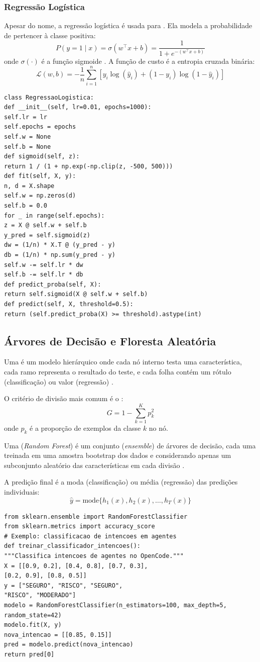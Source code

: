\subsubsection{Regressão Logística}
Apesar do nome, a regressão logística é usada para . Ela modela a probabilidade de pertencer à classe positiva:
\[P(y = 1 \mid x) = \sigma(w^\top x + b) = \frac{1}{1 + e^{-(w^\top x + b)}}
\]
onde $\sigma(\cdot)$ é a função sigmoide \cite{bishop2006pattern}.
A função de custo é a entropia cruzada binária:
\[\mathcal{L}(w, b) = -\frac{1}{n} \sum_{i=1}^n [y_i \log(\hat{y}_i) + (1 - y_i) \log(1 - \hat{y}_i)]
\]
\begin{lstlisting}[style=pythonstyle]
class RegressaoLogistica:
def __init__(self, lr=0.01, epochs=1000):
self.lr = lr
self.epochs = epochs
self.w = None
self.b = None
def sigmoid(self, z):
return 1 / (1 + np.exp(-np.clip(z, -500, 500)))
def fit(self, X, y):
n, d = X.shape
self.w = np.zeros(d)
self.b = 0.0
for _ in range(self.epochs):
z = X @ self.w + self.b
y_pred = self.sigmoid(z)
dw = (1/n) * X.T @ (y_pred - y)
db = (1/n) * np.sum(y_pred - y)
self.w -= self.lr * dw
self.b -= self.lr * db
def predict_proba(self, X):
return self.sigmoid(X @ self.w + self.b)
def predict(self, X, threshold=0.5):
return (self.predict_proba(X) >= threshold).astype(int)
\end{lstlisting}
\subsection{Árvores de Decisão e Floresta Aleatória}
\begin{definicao}
Uma  é um modelo hierárquico onde cada nó
interno testa uma característica, cada ramo representa o resultado do
teste, e cada folha contém um rótulo (classificação) ou valor (regressão)
\cite{quinlan1986induction}.
\end{definicao}
O critério de divisão mais comum é o :
\[G = 1 - \sum_{k=1}^K p_k^2
\]
onde $p_k$ é a proporção de exemplos da classe $k$ no nó.
\begin{definicao}
Uma  (\textit{Random Forest}) é um conjunto
(\textit{ensemble}) de árvores de decisão, cada uma treinada em uma amostra
bootstrap dos dados e considerando apenas um subconjunto aleatório das
características em cada divisão \cite{breiman2001random}.
\end{definicao}
A predição final é a moda (classificação) ou média (regressão) das
predições individuais:
\[\hat{y} = \text{mode}\{h_1(x), h_2(x), \ldots, h_T(x)\}
\]
\begin{lstlisting}[style=pythonstyle]
from sklearn.ensemble import RandomForestClassifier
from sklearn.metrics import accuracy_score
# Exemplo: classificacao de intencoes em agentes
def treinar_classificador_intencoes():
"""Classifica intencoes de agentes no OpenCode."""
X = [[0.9, 0.2], [0.4, 0.8], [0.7, 0.3],
[0.2, 0.9], [0.8, 0.5]]
y = ["SEGURO", "RISCO", "SEGURO",
"RISCO", "MODERADO"]
modelo = RandomForestClassifier(n_estimators=100, max_depth=5,
random_state=42)
modelo.fit(X, y)
nova_intencao = [[0.85, 0.15]]
pred = modelo.predict(nova_intencao)
return pred[0]
\end{lstlisting}
